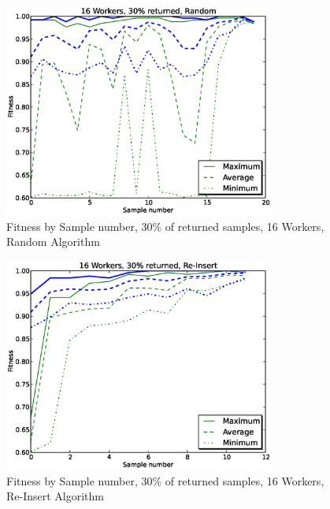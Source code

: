 \documentclass{sig-alternate}
\begin{document}
\begin{figure}[!t]
\centering
\includegraphics[width=3.5in]{eps/Fitness-w16-30-random.eps}
\caption{Fitness by Sample number, 30\% of returned samples, 16 Workers, Random Algorithm}
\label{fig:Fitness-w16-30-random}
\end{figure}

\begin{figure}[!t]
\centering
\includegraphics[width=3.5in]{eps/Fitness-w16-30-reinsert.eps}
\caption{Fitness by Sample number, 30\% of returned samples, 16 Workers, Re-Insert Algorithm}
\label{fig:Fitness-w16-30-reinsert}
\end{figure}
\end{document}

